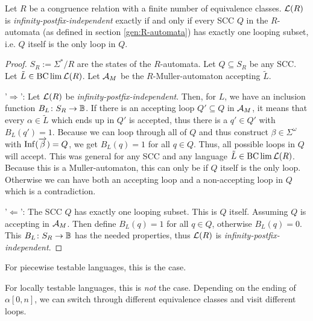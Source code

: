 \begin{lemma}
\label{gen:infPostfixIndep-AutLoops}
Let $R$ be a congruence relation with a finite number of equivalence classes. $\mathcal{L}(R)$ is \emph{infinity-postfix-independent} exactly if and only if every SCC $Q$ in the $R$-automata (as defined in section \ref{gen:R-automata}) has exactly one looping subset, i.e. $Q$ itself is the only loop in $Q$.
\begin{proof}
$S_R := \Sigma^*/R$ are the states of the $R$-automata. Let $Q \subseteq S_R$ be any SCC. Let $\tilde L \in \operatorname{BC} \lim \mathcal{L}(R)$. Let $\mathcal{A}_M$ be the $R$-Muller-automaton accepting $\tilde L$.

'$\Rightarrow$': Let $\mathcal{L}(R)$ be \emph{infinity-postfix-independent}. Then, for $L$, we have an inclusion function $B_L \colon S_R \rightarrow \mathbb{B}$. If there is an accepting loop $Q' \subseteq Q$ in $\mathcal{A}_M$, it means that every $\alpha \in \tilde L$ which ends up in $Q'$ is accepted, thus there is a $q' \in Q'$ with $B_L(q') = 1$. Because we can loop through all of $Q$ and thus construct $\beta \in \Sigma^\omega$ with $\operatorname{Inf}(\overrightarrow \beta) = Q$, we get $B_L(q) = 1$ for all $q \in Q$. Thus, all possible loops in $Q$ will accept. This was general for any SCC and any language $\tilde L \in \operatorname{BC} \lim \mathcal{L}(R)$. Because this is a Muller-automaton, this can only be if $Q$ itself is the only loop. Otherwise we can have both an accepting loop and a non-accepting loop in $Q$ which is a contradiction.

'$\Leftarrow$': The SCC $Q$ has exactly one looping subset. This is $Q$ itself. Assuming $Q$ is accepting in $\mathcal{A}_M$. Then define $B_L(q) = 1$ for all $q \in Q$, otherwise $B_L(q) = 0$. This $B_L \colon S_R \rightarrow \mathbb{B}$ has the needed properties, thus $\mathcal{L}(R)$ is \emph{infinity-postfix-independent}.
\end{proof}
\end{lemma}

For piecewise testable languages, this is the case.

For locally testable languages, this is \emph{not} the case. Depending on the ending of $\alpha[0,n]$, we can switch through different equivalence classes and visit different loops.


